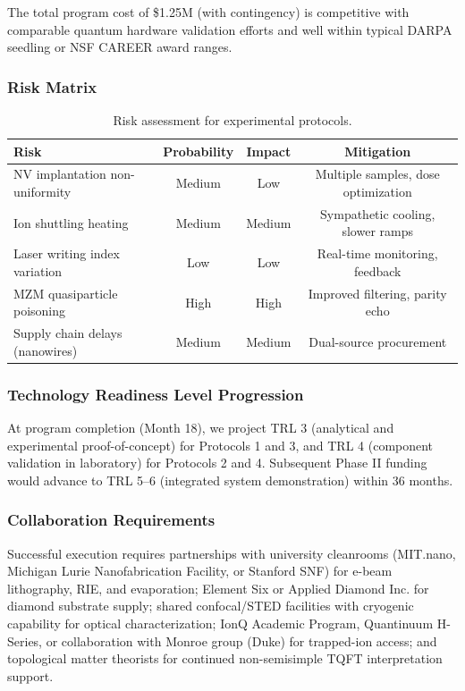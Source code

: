 The total program cost of \$1.25M (with contingency) is competitive with comparable quantum hardware validation efforts and well within typical DARPA seedling or NSF CAREER award ranges.

\subsubsection{Risk Matrix}

\begin{table}[h]
\caption{Risk assessment for experimental protocols.}
\label{tab:risk}
\begin{ruledtabular}
\begin{tabular}{lccc}
\textbf{Risk} & \textbf{Probability} & \textbf{Impact} & \textbf{Mitigation} \\
\hline
NV implantation non-uniformity & Medium & Low & Multiple samples, dose optimization \\
Ion shuttling heating & Medium & Medium & Sympathetic cooling, slower ramps \\
Laser writing index variation & Low & Low & Real-time monitoring, feedback \\
MZM quasiparticle poisoning & High & High & Improved filtering, parity echo \\
Supply chain delays (nanowires) & Medium & Medium & Dual-source procurement \\
\end{tabular}
\end{ruledtabular}
\end{table}

\subsubsection{Technology Readiness Level Progression}

At program completion (Month 18), we project TRL 3 (analytical and experimental proof-of-concept) for Protocols 1 and 3, and TRL 4 (component validation in laboratory) for Protocols 2 and 4. Subsequent Phase II funding would advance to TRL 5--6 (integrated system demonstration) within 36 months.

\subsubsection{Collaboration Requirements}

Successful execution requires partnerships with university cleanrooms (MIT.nano, Michigan Lurie Nanofabrication Facility, or Stanford SNF) for e-beam lithography, RIE, and evaporation; Element Six or Applied Diamond Inc. for diamond substrate supply; shared confocal/STED facilities with cryogenic capability for optical characterization; IonQ Academic Program, Quantinuum H-Series, or collaboration with Monroe group (Duke) for trapped-ion access; and topological matter theorists for continued non-semisimple TQFT interpretation support.

